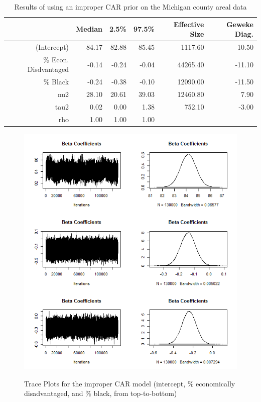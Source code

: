 \documentclass[12pt,letterpaper]{article}
\begin{document}
\begin{table}[h!]
\centering
  \caption{Results of using an improper CAR prior on the Michigan county areal data} 
  \label{tab:improper_car} 
\begin{tabular}{rrrrrr}
  \hline
 & Median & 2.5\% & 97.5\% & Effective Size & Geweke Diag. \\ 
  \hline
(Intercept) & 84.17 & 82.88 & 85.45 & 1117.60 & 10.50 \\ 
  \% Econ. Disdvantaged & -0.14 & -0.24 & -0.04 & 44265.40 & -11.10 \\ 
  \% Black & -0.24 & -0.38 & -0.10 & 12090.00 & -11.50 \\ 
  nu2 & 28.10 & 20.61 & 39.03 & 12460.80 & 7.90 \\ 
  tau2 & 0.02 & 0.00 & 1.38 & 752.10 & -3.00 \\ 
  rho & 1.00 & 1.00 & 1.00 &  &  \\ 
   \hline
\end{tabular}
\end{table}

\begin{figure}[h!]
\caption{Trace Plots for the improper CAR model (intercept, \% economically disadvantaged, and \% black, from top-to-bottom)}
\centering
\includegraphics[scale=.9]{trace_plots.png}
\label{lab:trace_plots}
\end{figure}
\end{document}
